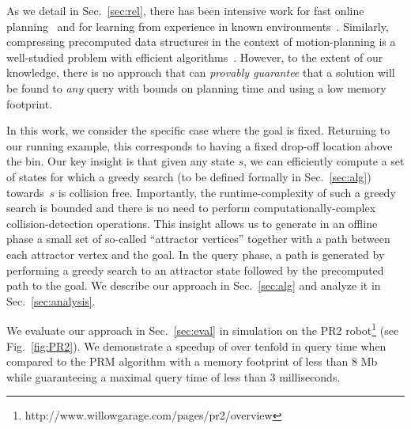 \documentclass[letterpaper]{article} %
\begin{document}
As we detail in Sec.~\ref{sec:rel}, there has been intensive work 
for fast online planning~\cite{LA18} and 
for learning from experience in known environments~\cite{PCCL12,PDCL13,BAG12,CSMOC15}.
Similarly, compressing precomputed data structures in the context of motion-planning is a well-studied problem with efficient algorithms~\cite{SSAH14,DB14}.
However, to the extent of our knowledge, there is no approach that can \emph{provably guarantee} that a solution will be found to \emph{any} query with bounds on planning time and using a low memory footprint.


In this work, we consider the specific case where the goal is fixed. Returning to our running example, this corresponds to having a fixed drop-off location above the bin.
%
Our key insight is that given any state $s$, we can efficiently compute a set of states for which a greedy search (to be defined formally in Sec.~\ref{sec:alg}) towards~$s$ is collision free.
Importantly, the runtime-complexity of such a greedy search is bounded and there is no need to perform computationally-complex collision-detection operations. 
This insight allows us to generate in an offline phase a small set of so-called ``attractor vertices'' together with a path between each attractor vertex and the goal.
In the query phase, a path is generated by performing a greedy search to an attractor state followed by the precomputed path to the goal.
We describe our approach in Sec.~\ref{sec:alg} and analyze it in Sec.~\ref{sec:analysis}.


We evaluate our approach in Sec.~\ref{sec:eval} in simulation on the PR2 robot\footnote{http://www.willowgarage.com/pages/pr2/overview} (see Fig.~\ref{fig:PR2}).
We demonstrate a speedup of over tenfold in query time when compared to the \textsf{PRM} algorithm with a memory footprint of less than 8 Mb while guaranteeing a maximal query time of less than 3 milliseconds.

\end{document}
